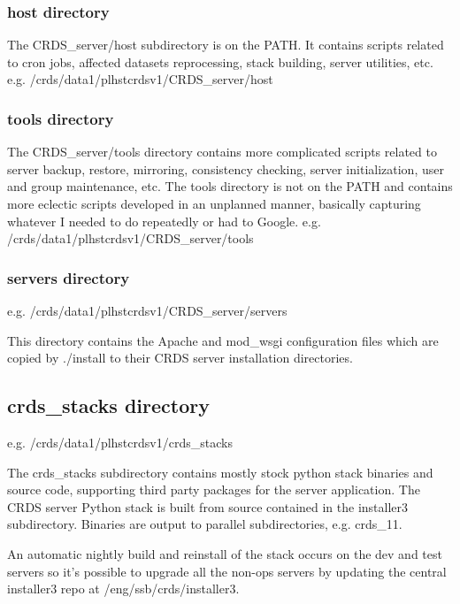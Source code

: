 \documentclass[letterpaper,10pt,english]{sphinxmanual}
\begin{document}
\subsubsection{host directory}
\label{server_guide:host-directory}
The CRDS\_server/host subdirectory is on the PATH.  It contains scripts related to cron jobs,  affected datasets
reprocessing, stack building,  server utilities, etc.   e.g. /crds/data1/plhstcrdsv1/CRDS\_server/host


\subsubsection{tools directory}
\label{server_guide:tools-directory}
The CRDS\_server/tools directory contains more complicated scripts related to server backup, restore, mirroring,
consistency checking, server initialization, user and group maintenance, etc.   The tools directory is not on the
PATH and contains more eclectic scripts developed in an unplanned manner,  basically capturing whatever I needed
to do repeatedly or had to Google.   e.g. /crds/data1/plhstcrdsv1/CRDS\_server/tools


\subsubsection{servers directory}
\label{server_guide:servers-directory}
e.g. /crds/data1/plhstcrdsv1/CRDS\_server/servers

This directory contains the Apache and mod\_wsgi configuration files which are copied by ./install to their CRDS
server installation directories.


\subsection{crds\_stacks directory}
\label{server_guide:crds-stacks-directory}
e.g. /crds/data1/plhstcrdsv1/crds\_stacks

The crds\_stacks subdirectory contains mostly stock python stack binaries and source code,  supporting third party packages
for the server application.  The CRDS server Python stack is built from source contained in the installer3 subdirectory.
Binaries are output to parallel subdirectories,  e.g. crds\_11.

An automatic nightly build and reinstall of the stack occurs on the dev and test servers so it's possible to upgrade all
the non-ops servers by updating the central installer3 repo at /eng/ssb/crds/installer3.
\end{document}
